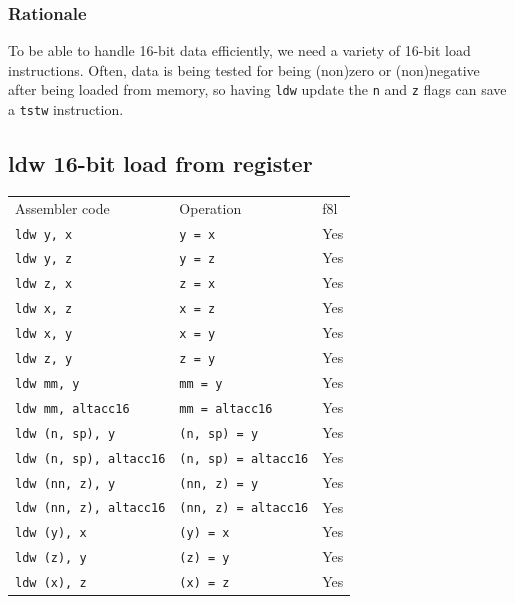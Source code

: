 \documentclass{book}
\begin{document}
\subsubsection*{Rationale}

To be able to handle 16-bit data efficiently, we need a variety of 16-bit load instructions. Often, data is being tested for being (non)zero or (non)negative after being loaded from memory, so having \texttt{ldw} update the \texttt{n} and \texttt{z} flags can save a \texttt{tstw} instruction.


\subsection{ldw 16-bit load from register}

\begin{tabular}{l l l}
Assembler code                   & Operation                   & f8l \\
\texttt{ldw y, x}                & \texttt{y = x}              & Yes \\
\texttt{ldw y, z}                & \texttt{y = z}              & Yes \\
\texttt{ldw z, x}                & \texttt{z = x}              & Yes \\
\texttt{ldw x, z}                & \texttt{x = z}              & Yes \\
\texttt{ldw x, y}                & \texttt{x = y}              & Yes \\
\texttt{ldw z, y}                & \texttt{z = y}              & Yes \\
\texttt{ldw mm, y}               & \texttt{mm = y}             & Yes \\
\texttt{ldw mm, altacc16}        & \texttt{mm = altacc16}      & Yes \\
\texttt{ldw (n, sp), y}          & \texttt{(n, sp) = y}        & Yes \\
\texttt{ldw (n, sp), altacc16}   & \texttt{(n, sp) = altacc16} & Yes \\
\texttt{ldw (nn, z), y}          & \texttt{(nn, z) = y}        & Yes \\
\texttt{ldw (nn, z), altacc16}   & \texttt{(nn, z) = altacc16} & Yes \\
\texttt{ldw (y), x}              & \texttt{(y) = x}            & Yes \\
\texttt{ldw (z), y}              & \texttt{(z) = y}            & Yes \\
\texttt{ldw (x), z}              & \texttt{(x) = z}            & Yes \\

\end{tabular}
\end{document}
